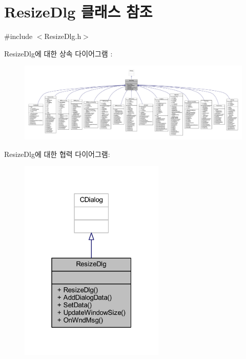 \hypertarget{class_resize_dlg}{}\section{Resize\+Dlg 클래스 참조}
\label{class_resize_dlg}


{\ttfamily \#include $<$Resize\+Dlg.\+h$>$}



Resize\+Dlg에 대한 상속 다이어그램 \+: \nopagebreak
\begin{figure}[H]
\begin{center}
\leavevmode
\includegraphics[width=350pt]{class_resize_dlg__inherit__graph}
\end{center}
\end{figure}


Resize\+Dlg에 대한 협력 다이어그램\+:\nopagebreak
\begin{figure}[H]
\begin{center}
\leavevmode
\includegraphics[width=196pt]{class_resize_dlg__coll__graph}
\end{center}
\end{figure}
